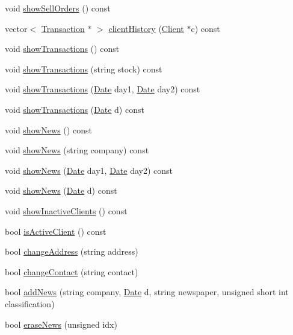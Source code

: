 \begin{DoxyCompactItemize}
void \hyperlink{class_market_aecbdf10d55744d01d95eba5027b671e0}{show\+Sell\+Orders} () const
\item 
vector$<$ \hyperlink{class_transaction}{Transaction} $\ast$ $>$ \hyperlink{class_market_aecf8063cd4ed62c3a74a44960b68eb7e}{client\+History} (\hyperlink{class_client}{Client} $\ast$c) const
\item 
void \hyperlink{class_market_a64150295ef3217f7ca581126b0f97c59}{show\+Transactions} () const
\item 
void \hyperlink{class_market_a0e812e86e9c5585e845bf0cc3dbc3fed}{show\+Transactions} (string stock) const
\item 
void \hyperlink{class_market_a52591efe5c3cf54723f5eff4f21f22f3}{show\+Transactions} (\hyperlink{class_date}{Date} day1, \hyperlink{class_date}{Date} day2) const
\item 
void \hyperlink{class_market_a69c72b9564aea368cb80e856cb54c9ec}{show\+Transactions} (\hyperlink{class_date}{Date} d) const
\item 
void \hyperlink{class_market_aa6ebd2d116f126606ab2b7cd34fe8fc7}{show\+News} () const
\item 
void \hyperlink{class_market_a535cb8ea17975f6f6525a23c84d44cbf}{show\+News} (string company) const
\item 
void \hyperlink{class_market_ac0a4c5af7d4b8c15a4c58677058909d9}{show\+News} (\hyperlink{class_date}{Date} day1, \hyperlink{class_date}{Date} day2) const
\item 
void \hyperlink{class_market_a97943574ae26cb5203db0a92c5148b5f}{show\+News} (\hyperlink{class_date}{Date} d) const
\item 
void \hyperlink{class_market_ac61a075368b27b8beea8054cd66d8068}{show\+Inactive\+Clients} () const
\item 
bool \hyperlink{class_market_a60df6a7d9ea6f4e2bd9eddc118fa81eb}{is\+Active\+Client} () const
\item 
bool \hyperlink{class_market_a0a1864c71f84d819280d92894a57b197}{change\+Address} (string address)
\item 
bool \hyperlink{class_market_a3dd294fab22a4de9ee4d29dbb6808af8}{change\+Contact} (string contact)
\item 
bool \hyperlink{class_market_a8465d2d146d10bd163325ac7503749fc}{add\+News} (string company, \hyperlink{class_date}{Date} d, string newspaper, unsigned short int classification)
\item 
bool \hyperlink{class_market_ab185568375c98363c52da328f926dfd8}{erase\+News} (unsigned idx)
\item 

\end{DoxyCompactItemize}
